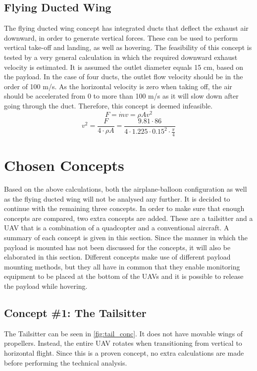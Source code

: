 \subsection{Flying Ducted Wing}
The flying ducted wing concept has integrated ducts that deflect the exhaust air downward, in order to generate vertical forces. These can be used to perform vertical take-off and landing, as well as hovering. The feasibility of this concept is tested by a very general calculation in which the required downward exhaust velocity is estimated. It is assumed the outlet diameter equals 15 cm, based on the payload. In the case of four ducts, the outlet flow velocity should be in the order of 100 m/s. As the horizontal velocity is zero when taking off, the air should be accelerated from 0 to more than 100 m/s as it will slow down after going through the duct. Therefore, this concept is deemed infeasible.
$$F = \dot{m} v = \rho A v^2 $$
$$v^2 = \frac{F}{4 \cdot \rho A} = \frac{9.81 \cdot 86}{4 \cdot 1.225 \cdot 0.15^2 \cdot \frac{\pi}{4}}$$


\section{Chosen Concepts}
\label{sec:chosconc}

Based on the above calculations, both the airplane-balloon configuration as well as the flying ducted wing will not be analysed any further. It is decided to continue with the remaining three concepts. In order to make sure that enough concepts are compared, two extra concepts are added. These are a tailsitter and a UAV that is a combination of a quadcopter and a conventional aircraft. A summary of each concept is given in this section. Since the manner in which the payload is mounted has not been discussed for the concepts, it will also be elaborated in this section. Different concepts make use of different payload mounting methods, but they all have in common that they enable monitoring equipment to be placed at the bottom of the UAVs and it is possible to release the payload while hovering. 

\subsection{Concept \#1: The Tailsitter}
The Tailsitter can be seen in \autoref{fig:tail_conc}. It does not have movable wings of propellers. Instead, the entire UAV rotates when transitioning from vertical to horizontal flight. Since this is a proven concept\footnotemark, no extra calculations are made before performing the technical analysis. 


